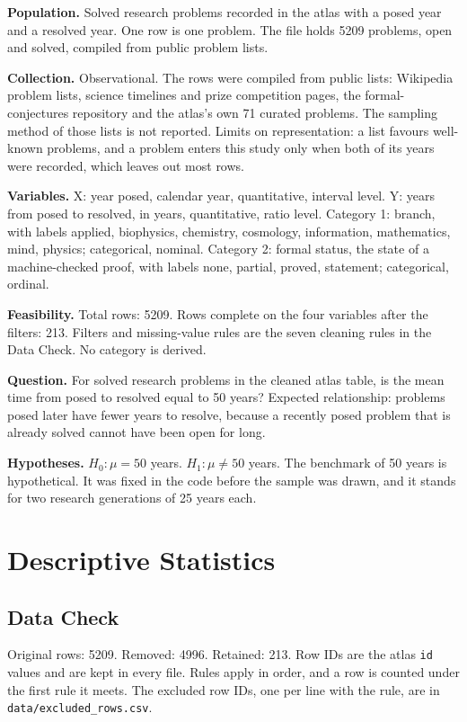 \documentclass[11pt]{article}
\begin{document}
\textbf{Population.} Solved research problems recorded in the atlas with a posed year and a resolved year. One row is one problem. The file holds 5209 problems, open and solved, compiled from public problem lists.

\textbf{Collection.} Observational. The rows were compiled from public lists: Wikipedia problem lists, science timelines and prize competition pages, the formal-conjectures repository and the atlas's own 71 curated problems. The sampling method of those lists is not reported. Limits on representation: a list favours well-known problems, and a problem enters this study only when both of its years were recorded, which leaves out most rows.

\textbf{Variables.} X: year posed, calendar year, quantitative, interval level. Y: years from posed to resolved, in years, quantitative, ratio level. Category 1: branch, with labels applied, biophysics, chemistry, cosmology, information, mathematics, mind, physics; categorical, nominal. Category 2: formal status, the state of a machine-checked proof, with labels none, partial, proved, statement; categorical, ordinal.

\textbf{Feasibility.} Total rows: 5209. Rows complete on the four variables after the filters: 213. Filters and missing-value rules are the seven cleaning rules in the Data Check. No category is derived.

\textbf{Question.} For solved research problems in the cleaned atlas table, is the mean time from posed to resolved equal to 50 years? Expected relationship: problems posed later have fewer years to resolve, because a recently posed problem that is already solved cannot have been open for long.

\textbf{Hypotheses.} $H_0: \mu = 50$ years. $H_1: \mu \ne 50$ years. The benchmark of 50 years is hypothetical. It was fixed in the code before the sample was drawn, and it stands for two research generations of 25 years each.

\section{Descriptive Statistics}

\subsection{Data Check}

Original rows: 5209. Removed: 4996. Retained: 213. Row IDs are the atlas \texttt{id} values and are kept in every file. Rules apply in order, and a row is counted under the first rule it meets. The excluded row IDs, one per line with the rule, are in \texttt{data/excluded\_rows.csv}.
\end{document}
